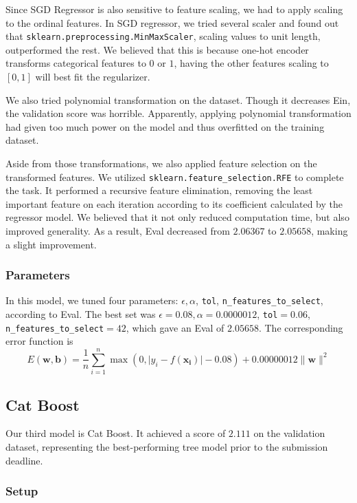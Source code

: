 \documentclass[10pt,letterpaper]{article}
\begin{document}
Since SGD Regressor is also sensitive to feature scaling, we had to apply scaling to the ordinal features. In SGD regressor, we tried several scaler and found out that \texttt{sklearn.preprocessing.MinMaxScaler}, scaling values to unit length, outperformed the rest. We believed that this is because one-hot encoder transforms categorical features to $0$ or $1$, having the other features scaling to $[0, 1]$ will best fit the regularizer. 

We also tried polynomial transformation on the dataset. Though it decreases Ein, the validation score was horrible. Apparently, applying polynomial transformation had given too much power on the model and thus overfitted on the training dataset. 

Aside from those transformations, we also applied feature selection on the transformed features. We utilized \texttt{sklearn.feature\_selection.RFE} to complete the task. It performed a recursive feature elimination, removing the least important feature on each iteration according to its coefficient calculated by the regressor model. We believed that it not only reduced computation time, but also improved generality. As a result, Eval decreased from $2.06367$ to $2.05658$, making a slight improvement. 

\subsubsection{Parameters}

In this model, we tuned four parameters: $\epsilon, \alpha$, \texttt{tol}, \texttt{n\_features\_to\_select}, according to Eval.
The best set was $\epsilon=0.08, \alpha=0.0000012$, \texttt{tol}$=0.06$, \texttt{n\_features\_to\_select}$=42$, which gave an Eval of $2.05658$. The corresponding error function is 
$$
	E(\mathbf{w}, \mathbf{b}) = \frac{1}{n}\sum_{i=1}^n \max(0, \lvert y_i - f(\mathbf{x_i})\rvert - 0.08) + 0.00000012\lVert\mathbf{w}\rVert^2
$$

\subsection{Cat Boost}

Our third model is Cat Boost. It achieved a score of $2.111$ on the validation dataset, representing the best-performing tree model prior to the submission deadline. 

\subsubsection{Setup}
\end{document}
